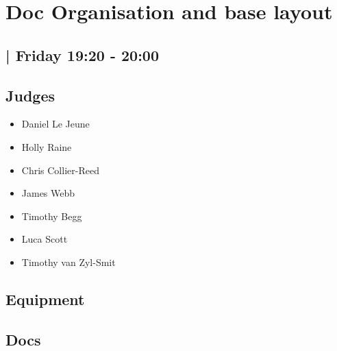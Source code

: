 \documentclass[10pt]{article}
\begin{document}
		\begin{minipage}{\linewidth}
		\setcounter{section}{6}
	\section{Doc Organisation and base layout }
	\subsection*{ | Friday 19:20 - 20:00}

	

	\begin{multicols}{2}
	\subsection*{\faUsers \: Judges}
	\begin{itemize}
			\item Daniel Le Jeune
			\item Holly Raine
			\item Chris Collier-Reed
			\item James Webb
			\item Timothy Begg
			\item Luca Scott
			\item Timothy van Zyl-Smit
		\end{itemize}
	\columnbreak
	\subsection*{\faWrench \: Equipment}
	        \vfill\null
        \subsection*{\faFile \: Docs}
     	\end{multicols}


	\vspace{1cm}
	\end{minipage}
\end{document}
